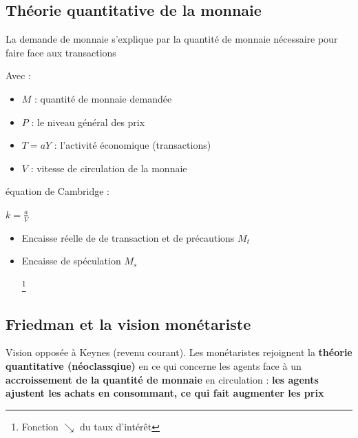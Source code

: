 \subsection{Théorie quantitative de la monnaie}
\textcolor{BrickRed}{La demande de monnaie s'explique par la quantité de monnaie nécessaire pour faire face aux transactions} \newline
\begin{center}
    \Large{}
\end{center}
Avec :
\begin{itemize}
    \item $M$ : quantité de monnaie demandée
    \item $P$ : le niveau général des prix
    \item $T = aY$ : l'activité économique (transactions)
    \item $V$ : vitesse de circulation de la monnaie
\end{itemize}
équation de Cambridge :
\begin{center}
    \Large{}
\end{center}
$k = \frac{a}{V}$
\newpage
\begin{itemize}
    \item Encaisse réelle de de transaction et de précautions $M_{t}$
\begin{center}
    \Large{}
\end{center}
    \item Encaisse de spéculation $M_{s}$
\begin{center}
    \Large{}\footnote{Fonction $\searrow$ du taux d'intérêt}
\end{center}
\end{itemize}
\subsection{Friedman et la vision monétariste}
Vision opposée à Keynes (revenu courant). Les monétaristes rejoignent la \textbf{théorie quantitative (néoclassqiue)} en ce qui concerne les agents face à un \textbf{accroissement de la quantité de monnaie} en circulation : \textbf{les agents ajustent les achats en consommant, ce qui fait augmenter les prix}
